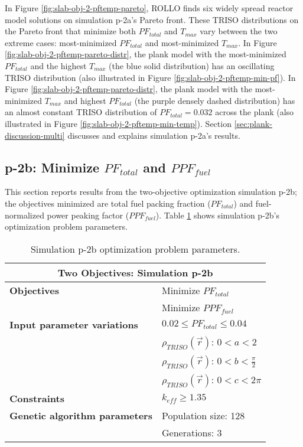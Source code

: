 In Figure \ref{fig:slab-obj-2-pftemp-pareto}, \gls{ROLLO} finds six widely spread 
reactor model solutions on simulation p-2a's Pareto front. 
These \gls{TRISO} distributions on the Pareto front that minimize both $PF_{total}$ and 
$T_{max}$ vary between the two extreme cases: 
most-minimized $PF_{total}$ and most-minimized $T_{max}$. 
In Figure \ref{fig:slab-obj-2-pftemp-pareto-distr}, the plank model with the
most-minimized $PF_{total}$ and the highest $T_{max}$ (the blue solid distribution) 
has an oscillating TRISO distribution (also illustrated in Figure 
\ref{fig:slab-obj-2-pftemp-min-pf}).
In Figure \ref{fig:slab-obj-2-pftemp-pareto-distr}, the plank model with the 
most-minimized $T_{max}$ and highest $PF_{total}$ (the purple densely dashed distribution)
has an almost constant TRISO distribution of $PF_{total}=0.032$ across the plank (also 
illustrated in Figure \ref{fig:slab-obj-2-pftemp-min-temp}). 
Section \ref{sec:plank-discussion-multi} discusses and explains simulation p-2a's results.

\subsection{p-2b: Minimize $PF_{total}$ and $PPF_{fuel}$}
\label{sec:p-2b}
This section reports results from the two-objective optimization simulation p-2b; the 
objectives minimized are total fuel packing fraction ($PF_{total}$) and fuel-normalized 
power peaking factor ($PPF_{fuel}$).  
Table \ref{tab:simulationp2b} shows simulation p-2b's optimization problem parameters. 
\begin{table}[htbp!]
    \centering
    \onehalfspacing
    \caption{Simulation p-2b optimization problem parameters.}
	\label{tab:simulationp2b}
    \footnotesize
    \begin{tabular}{l|p{4cm}}
    \hline 
    \multicolumn{2}{c}{\textbf{Two Objectives: Simulation p-2b}} \\
    \hline 
    \textbf{Objectives} & Minimize $PF_{total}$ \\
    & Minimize $PPF_{fuel}$ \\
    \hline 
    \textbf{Input parameter variations} & $0.02 \leq PF_{total} \leq 0.04$ \\
    & $\rho_{TRISO}(\vec{r})$: $0<a<2$ \\
    & $\rho_{TRISO}(\vec{r})$: $0<b<\frac{\pi}{2}$ \\
    & $\rho_{TRISO}(\vec{r})$: $0<c<2\pi$ \\
    \hline
    \textbf{Constraints} & $k_{eff} \geq 1.35$\\ 
    \hline 
    \textbf{Genetic algorithm parameters} & Population size: 128 \\
    & Generations: 3 \\
    \hline
    \end{tabular}
\end{table}

